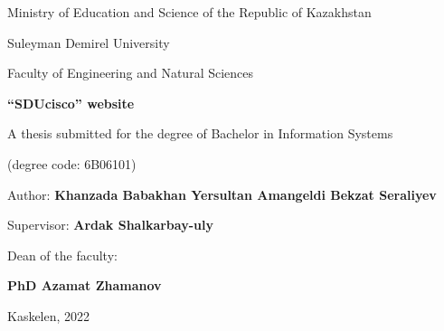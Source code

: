 \newpage
\pagestyle{empty}

\begin{center}
\large
Ministry of Education and Science of the Republic of Kazakhstan

Suleyman Demirel University

Faculty of Engineering and Natural Sciences

\vspace{2cm}
\textbf{\mytitle  “SDUcisco” website}

\vspace{1cm}
\large
A thesis submitted for the degree of
Bachelor in Information Systems


\mydegree

(degree code: \mydegreecode 6B06101)

\vspace{2cm}
Author: \textbf{\myauthor
Khanzada Babakhan
Yersultan Amangeldi
Bekzat Seraliyev
}

\vspace{2cm}
Supervisor: \textbf{\mycoach Ardak Shalkarbay-uly}

\vspace{2cm}
Dean of the faculty: 

\textbf{PhD Azamat Zhamanov}


\vfill
Kaskelen, 2022
\end{center}
